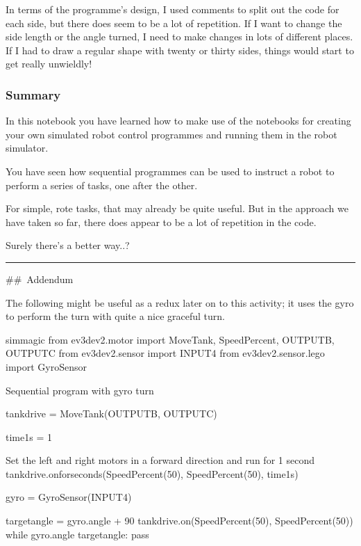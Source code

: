 \documentclass[letterpaper,10pt,english]{sphinxmanual}
\begin{document}
In terms of the programme’s design, I used comments to split out the code for each side, but there does seem to be a lot of repetition. If I want to change the side length or the angle turned, I need to make changes in lots of different places. If I had to draw a regular shape with twenty or thirty sides, things would start to get really unwieldly!


\subsubsection{Summary}
\label{\detokenize{content/01_Robot_Lab/Section_00_01:Summary}}
In this notebook you have learned how to make use of the notebooks for creating your own simulated robot control programmes and running them in the robot simulator.

You have seen how sequential programmes can be used to instruct a robot to perform a series of tasks, one after the other.

For simple, rote tasks, that may already be quite useful. But in the approach we have taken so far, there does appear to be a lot of repetition in the code.

Surely there’s a better way..?


\bigskip\hrule\bigskip


\#\# Addendum

The following might be useful as a redux later on to this activity; it uses the gyro to perform the turn with quite a nice graceful turn.

{
\begin{sphinxVerbatim}[commandchars=\\\{\}]
\llap{\color{nbsphinxin}[ ]:\,\hspace{\fboxrule}\hspace{\fboxsep}}\PYGZpc{}\PYGZpc{}sim\PYGZus{}magic
from ev3dev2.motor import MoveTank, SpeedPercent, OUTPUT\PYGZus{}B, OUTPUT\PYGZus{}C
from ev3dev2.sensor import INPUT\PYGZus{}4
from ev3dev2.sensor.lego import GyroSensor

\PYGZsh{} Sequential program with gyro turn

tank\PYGZus{}drive = MoveTank(OUTPUT\PYGZus{}B, OUTPUT\PYGZus{}C)

time\PYGZus{}1s = 1

\PYGZsh{} Set the left and right motors in a forward direction
\PYGZsh{} and run for 1 second
tank\PYGZus{}drive.on\PYGZus{}for\PYGZus{}seconds(SpeedPercent(50), SpeedPercent(50), time\PYGZus{}1s)


gyro = GyroSensor(INPUT\PYGZus{}4)

target\PYGZus{}angle = gyro.angle + 90
tank\PYGZus{}drive.on(SpeedPercent(50), SpeedPercent(\PYGZhy{}50))
while gyro.angle \PYGZlt{} target\PYGZus{}angle:
    pass
\end{sphinxVerbatim}
}
\end{document}

